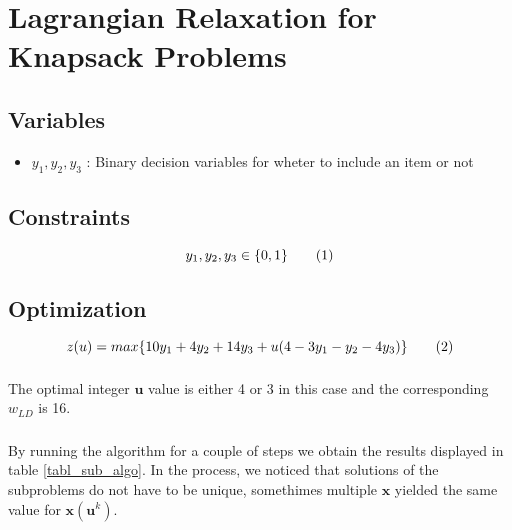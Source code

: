 \section{Lagrangian Relaxation for Knapsack Problems}

\subsection{Variables}
\begin{itemize}
	\item $y_1, y_2, y_3$ : Binary decision variables for wheter to include an item or not
\end{itemize}

\subsection{Constraints}

\[ y_1,y_2,y_3 \in \{0,1\} \addtag \]

\subsection{Optimization}
\[ z(u) = max\{10y_1 + 4y_2 + 14y_3 + u(4 - 3y_1 - y_2 - 4y_3)\} \addtag \]

\subsubsection{ }  

The optimal integer $\mathbf{u}$ value is either 4 or 3 in this case and the corresponding $w_{LD}$ is 16.

\subsubsection{ } 

By running the algorithm for a couple of steps we obtain the results displayed in table \ref{tabl_sub_algo}. In the process, we noticed that solutions of the subproblems do not have to be unique, somethimes multiple $\mathbf{x}$ yielded the same value for $\mathbf{x}(\mathbf{u}^k)$.


